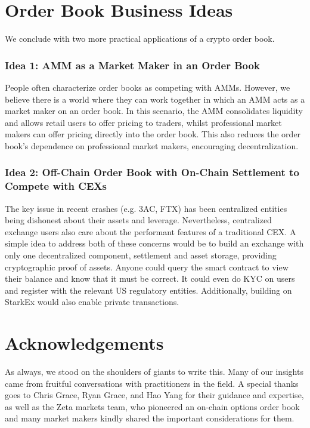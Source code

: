 \documentclass{article}
\begin{document}
\section{Order Book Business Ideas}

We conclude with two more practical applications of a crypto order book. 

\subsubsection{Idea 1: AMM as a Market Maker in an Order Book}
\noindent People often characterize order books as competing with AMMs. However, we believe there is a world where they can work together in which an AMM acts as a market maker on an order book. In this scenario, the AMM consolidates liquidity and allows retail users to offer pricing to traders, whilst professional market makers can offer pricing directly into the order book. This also reduces the order book's dependence on professional market makers, encouraging decentralization.

\subsubsection{Idea 2: Off-Chain Order Book with On-Chain Settlement to Compete with CEXs} 
\noindent The key issue in recent crashes (e.g. 3AC, FTX) has been centralized entities being dishonest about their assets and leverage. Nevertheless, centralized exchange users also care about the performant features of a traditional CEX. A simple idea to address both of these concerns would be to build an exchange with only one decentralized component, settlement and asset storage, providing cryptographic proof of assets. Anyone could query the smart contract to view their balance and know that it must be correct. It could even do KYC on users and register with the relevant US regulatory entities. Additionally, building on StarkEx would also enable private transactions. 

\section{Acknowledgements}

As always, we stood on the shoulders of giants to write this. Many of our insights came from fruitful conversations with practitioners in the field. A special thanks goes to Chris Grace, Ryan Grace, and Hao Yang for their guidance and expertise, as well as the Zeta markets team, who pioneered an on-chain options order book and many market makers kindly shared the important considerations for them.
\end{document}
